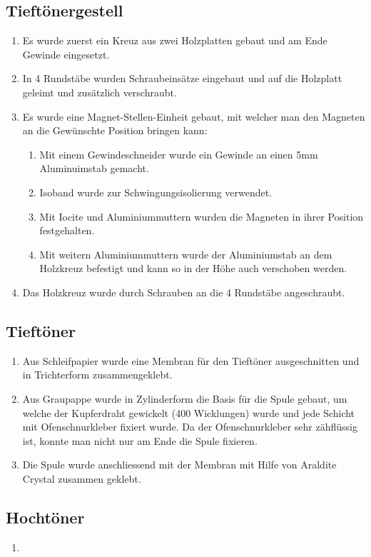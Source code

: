 \documentclass[a4paper,11pt]{report}
\begin{document}
\newpage
\subsection{Tieftönergestell}
\begin{enumerate}
    \item Es wurde zuerst ein Kreuz aus zwei Holzplatten gebaut und am Ende Gewinde eingesetzt.
    \item In 4 Rundstäbe wurden Schraubeinsätze eingebaut und auf die Holzplatt geleimt und zusätzlich verschraubt.
    \item Es wurde eine Magnet-Stellen-Einheit gebaut, mit welcher man den Magneten an die Gewünschte Position bringen kann:
    \begin{enumerate}
        \item Mit einem Gewindeschneider wurde ein Gewinde an einen 5mm Aluminuimstab gemacht.
        \item Isoband wurde zur Schwingungsisolierung verwendet.
        \item Mit Iocite und Aluminiummuttern wurden die Magneten in ihrer Position festgehalten.
        \item Mit weitern Aluminiummuttern wurde der Aluminiumstab an dem Holzkreuz befestigt und kann so in der Höhe auch verschoben werden.
    \end{enumerate}
    \item Das Holzkreuz wurde durch Schrauben an die 4 Rundstäbe angeschraubt.
\end{enumerate}
\subsection{Tieftöner}
\begin{enumerate}
    \item Aus Schleifpapier wurde eine Membran für den Tieftöner ausgeschnitten und in Trichterform zusammengeklebt.
    \item Aus Graupappe wurde in Zylinderform die Basis für die Spule gebaut, um welche der Kupferdraht gewickelt (400 Wicklungen) wurde und jede Schicht mit Ofenschnurkleber fixiert wurde. Da der Ofenschnurkleber sehr zähflüssig ist, konnte man nicht nur am Ende die Spule fixieren.
    \item Die Spule wurde anschliessend mit der Membran mit Hilfe von Araldite Crystal zusammen geklebt.
\end{enumerate}
\subsection{Hochtöner}
\begin{enumerate}
    \item 
\end{enumerate}
\end{document}
